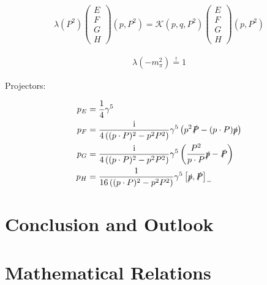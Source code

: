 \documentclass[oneside, openany]{book}
\numberwithin{equation}{chapter}
\numberwithin{figure}{chapter}
\newcommand{\ii}{\mathrm{i}}
\newcommand{\p}[0]{\slashed{p}}
\newcommand{\g}[0]{\gamma}
\begin{document}
\begin{align}
	\lambda(P^2) 
	\begin{pmatrix}
		E \\
		F \\
		G \\
		H
	\end{pmatrix}(p, P^2)
	=
	\mathcal K(p,q,P^2)
	\begin{pmatrix}
		E \\
		F \\
		G \\
		H
	\end{pmatrix}(p, P^2)
\end{align}

\begin{align}
	\lambda(-m_\pi^2) \overset{!}{=} 1 
\end{align}

Projectors:

\begin{align}
	p_E &= \frac{1}{4} \g^5 \\
	p_F &= \frac{\ii}{4\left((p\cdot P)^2 - p^2 P^2\right)} \g^5 \left( p^2 \slashed P - (p\cdot P) \p \right) \\
	p_G &= \frac{\ii}{4\left((p\cdot P)^2 - p^2 P^2\right)} \g^5 \left( \frac{P^2}{p\cdot P} \p - \slashed P\right) \\
	p_H &= \frac{1}{16\left((p\cdot P)^2 - p^2 P^2\right)} \g^5 \left[ \p, \slashed P \right]_-
\end{align}

\chapter{Conclusion and Outlook} \label{ch:6}

\appendix

\chapter{Mathematical Relations}
\end{document}
